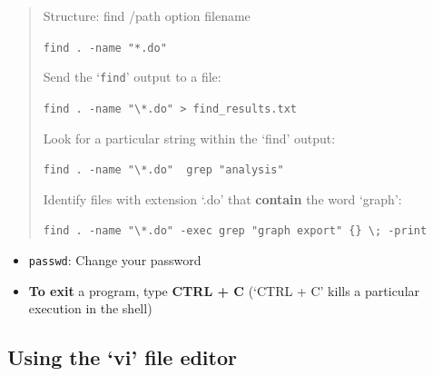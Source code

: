 \documentclass[
  11pt,
  a4paper,
]{article}
\begin{document}
\begin{quote}
Structure: find /path option filename

\texttt{find\ .\ -name\ "*.do"}

Send the `\texttt{find}' output to a file:

\texttt{find\ .\ -name\ "\textbackslash{}*.do"\ \textgreater{}\ find\_results.txt}

Look for a particular string within the `find' output:

\texttt{find\ .\ -name\ "\textbackslash{}*.do"\ \textbar{}\ grep\ "analysis"}

Identify files with extension `.do' that \textbf{contain} the word
`graph':

\texttt{find\ .\ -name\ "\textbackslash{}*.do"\ -exec\ grep\ "graph\ export"\ \textquotesingle{}\{\}\textquotesingle{}\ \textbackslash{};\ -print}
\end{quote}

\begin{itemize}
\item
  \texttt{passwd}: Change your password
\item
  \textbf{To exit} a program, type \textbf{CTRL + C} (`CTRL + C' kills a
  particular execution in the shell)
\end{itemize}

\hypertarget{using-the-vi-file-editor}{%
\subsection{Using the `vi' file editor}\label{using-the-vi-file-editor}}
\end{document}
